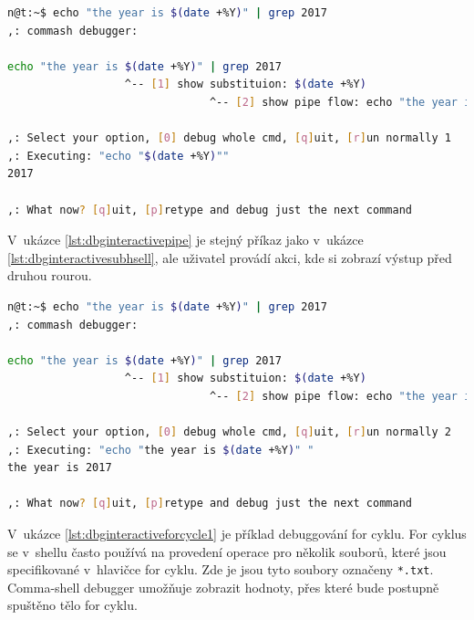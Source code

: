 \documentclass[thesis=M,czech]{FITthesis}[2012/06/26]
\begin{document}
\noindent
\begin{minipage}{\linewidth}
\begin{lstlisting}[language=bash, caption={Debugger interaktivního shellu - subshell}, label={lst:dbginteractivesubhsell}]
n@t:~$ echo "the year is $(date +%Y)" | grep 2017
,: commash debugger:

echo "the year is $(date +%Y)" | grep 2017
                  ^-- [1] show substituion: $(date +%Y)
                               ^-- [2] show pipe flow: echo "the year is $(date +%Y)"

,: Select your option, [0] debug whole cmd, [q]uit, [r]un normally 1
,: Executing: "echo "$(date +%Y)""
2017

,: What now? [q]uit, [p]retype and debug just the next command
\end{lstlisting}
\end{minipage}

V~ukázce \ref{lst:dbginteractivepipe} je stejný příkaz jako v~ukázce \ref{lst:dbginteractivesubhsell}, ale uživatel provádí akci, kde si zobrazí výstup před druhou rourou.

\noindent
\begin{minipage}{\linewidth}
\begin{lstlisting}[language=bash, caption={Debugger interaktivního shellu - subshell}, label={lst:dbginteractivepipe}]
n@t:~$ echo "the year is $(date +%Y)" | grep 2017
,: commash debugger:

echo "the year is $(date +%Y)" | grep 2017
                  ^-- [1] show substituion: $(date +%Y)
                               ^-- [2] show pipe flow: echo "the year is $(date +%Y)"

,: Select your option, [0] debug whole cmd, [q]uit, [r]un normally 2
,: Executing: "echo "the year is $(date +%Y)" "
the year is 2017

,: What now? [q]uit, [p]retype and debug just the next command
\end{lstlisting}
\end{minipage}

V~ukázce \ref{lst:dbginteractiveforcycle1} je příklad debuggování for cyklu. For cyklus se v~shellu často používá na provedení operace pro několik souborů, které jsou specifikované v~hlavičce for cyklu. Zde je jsou tyto soubory označeny \texttt{*.txt}. Comma-shell debugger umožňuje zobrazit hodnoty, přes které bude postupně spuštěno tělo for cyklu.
\end{document}

